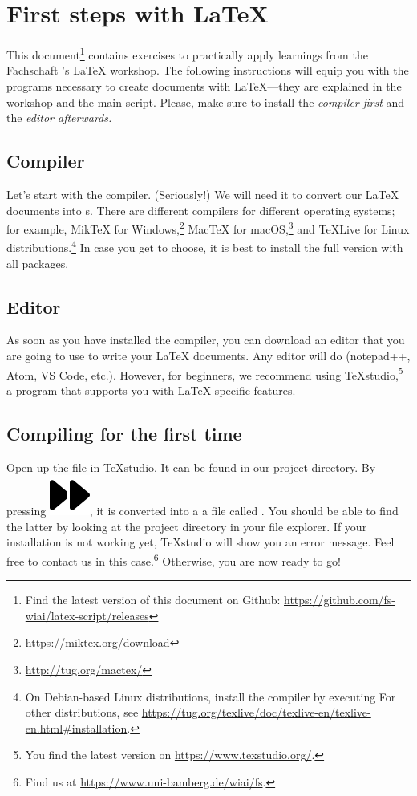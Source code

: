 \newpage
{}
\pagecolor{latexblue}

\chapter*{First steps with \LaTeX}

This document\footnote{Find the latest version of this document on Github: \url{https://github.com/fs-wiai/latex-script/releases}} contains exercises to practically apply learnings from the Fachschaft 's \LaTeX{} workshop.
The following instructions will equip you with the programs necessary to create documents with \LaTeX{}---they are explained in the workshop and the main script.
Please, make sure to install the \emph{compiler first} and the \emph{editor afterwards}\textit{.}

\section*{Compiler}
Let’s start with the compiler.
(Seriously!)
We will need it to convert our \LaTeX{} documents into s.
There are different compilers for different operating systems;
for example, MikTeX for Windows,\footnote{\url{https://miktex.org/download}} Mac\TeX{} for macOS,\footnote{\url{http://tug.org/mactex/}} and \TeX{}Live for Linux distributions.\footnote{On Debian-based Linux distributions, install the compiler by executing 
For other distributions, see \url{https://tug.org/texlive/doc/texlive-en/texlive-en.html\#installation}.}
In case you get to choose, it is best to install the full version with all packages.

\section*{Editor}
As soon as you have installed the compiler, you can download an editor that you are going to use to write your \LaTeX{} documents.
Any editor will do (notepad++, Atom, VS Code, etc.).
However, for beginners, we recommend using \TeX{}studio,\footnote{You find the latest version on \url{https://www.texstudio.org/}.} a program that supports you with \LaTeX-specific features.

\section*{Compiling for the first time}
Open up the file  in \TeX{}studio. 
It can be found in our project directory.
By pressing \includegraphics[width=.8em]{graphics/faForward.png}, it is converted into a a file called .
You should be able to find the latter by looking at the project directory in your file explorer.
If your installation is not working yet, \TeX{}studio will show you an error message.
Feel free to contact us in this case.\footnote{Find us at \url{https://www.uni-bamberg.de/wiai/fs}.}
Otherwise, you are now ready to go!

\newpage
\nopagecolor
